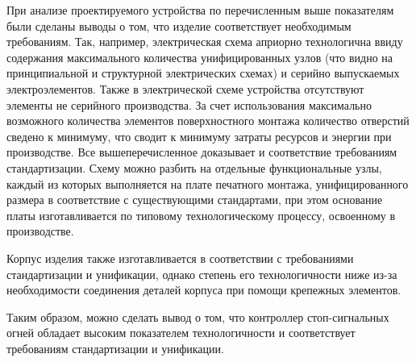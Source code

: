 При анализе проектируемого устройства по перечисленным выше
показателям были сделаны выводы о том, что изделие соответствует
необходимым требованиям. Так, например, электрическая схема априорно
технологична ввиду содержания максимального количества унифицированных
узлов (что видно на принципиальной и структурной электрических схемах)
и серийно выпускаемых электроэлементов. Также в электрической схеме
устройства отсутствуют элементы не серийного производства. За счет
использования максимально возможного количества элементов
поверхностного монтажа количество отверстий сведено к минимуму, что
сводит к минимуму затраты ресурсов и энергии при производстве. Все
вышеперечисленное доказывает и соответствие требованиям
стандартизации. Схему можно разбить на отдельные функциональные узлы,
каждый из которых выполняется на плате печатного монтажа,
унифицированного размера в соответствие с существующими стандартами,
при этом основание платы изготавливается по типовому технологическому
процессу, освоенному в производстве.

Корпус изделия также изготавливается в соответствии с требованиями
стандартизации и унификации, однако степень его технологичности ниже
из-за необходимости соединения деталей корпуса при помощи крепежных
элементов.

Таким образом, можно сделать вывод о том, что контроллер
стоп-сигнальных огней обладает высоким показателем технологичности и
соответствует требованиям стандартизации и унификации.

\newpage


